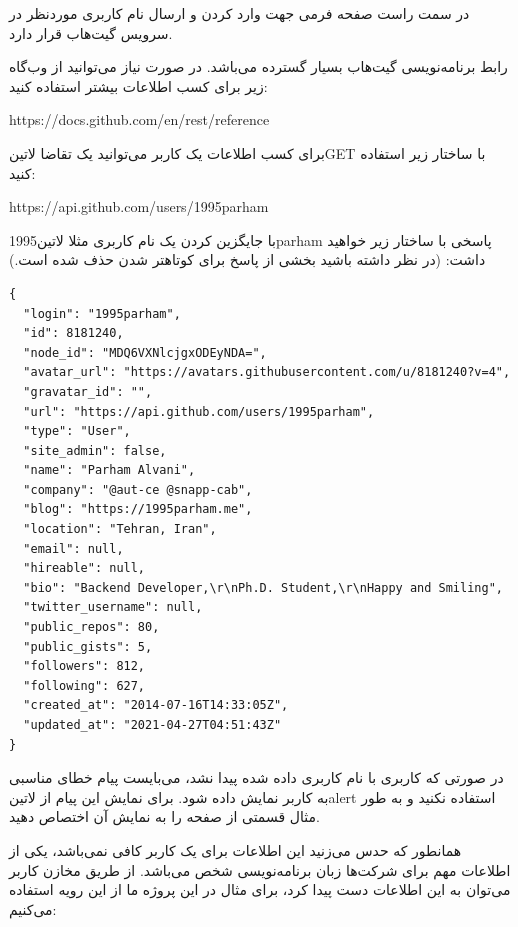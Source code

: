 \documentclass[../main.tex]{subfiles}
\begin{document}
در سمت راست صفحه فرمی جهت وارد کردن و ارسال نام کاربری موردنظر در سرویس گیت‌هاب قرار دارد.

رابط برنامه‌نویسی گیت‌هاب بسیار گسترده می‌باشد. در صورت نیاز می‌توانید از وب‌گاه زیر برای کسب اطلاعات بیشتر استفاده کنید:

\begin{latin}\begin{center}
https://docs.github.com/en/rest/reference
\end{center}\end{latin}

برای کسب اطلاعات یک کاربر می‌توانید یک تقاضا ‌لاتین{GET} با ساختار زیر استفاده کنید:

\begin{latin}\begin{center}
https://api.github.com/users/1995parham
\end{center}\end{latin}

با جایگزین کردن یک نام کاربری مثلا ‌لاتین{1995parham} پاسخی با ساختار زیر خواهید داشت:
(در نظر داشته باشید بخشی از پاسخ برای کوتاهتر شدن حذف شده است.)

\begin{latin}
\begin{verbatim}
{
  "login": "1995parham",
  "id": 8181240,
  "node_id": "MDQ6VXNlcjgxODEyNDA=",
  "avatar_url": "https://avatars.githubusercontent.com/u/8181240?v=4",
  "gravatar_id": "",
  "url": "https://api.github.com/users/1995parham",
  "type": "User",
  "site_admin": false,
  "name": "Parham Alvani",
  "company": "@aut-ce @snapp-cab",
  "blog": "https://1995parham.me",
  "location": "Tehran, Iran",
  "email": null,
  "hireable": null,
  "bio": "Backend Developer,\r\nPh.D. Student,\r\nHappy and Smiling",
  "twitter_username": null,
  "public_repos": 80,
  "public_gists": 5,
  "followers": 812,
  "following": 627,
  "created_at": "2014-07-16T14:33:05Z",
  "updated_at": "2021-04-27T04:51:43Z"
}
\end{verbatim}
\end{latin}

در صورتی که کاربری با نام کاربری داده شده پیدا نشد، می‌بایست پیام خطای مناسبی به کاربر نمایش داده شود.
برای نمایش این پیام از ‌لاتین{alert} استفاده نکنید و به طور مثال قسمتی از صفحه را به نمایش آن اختصاص دهید.

همانطور که حدس می‌زنید این اطلاعات برای یک کاربر کافی نمی‌باشد، یکی از اطلاعات مهم برای شرکت‌ها زبان برنامه‌نویسی شخص می‌باشد.
از طریق مخازن کاربر می‌توان به این اطلاعات دست پیدا کرد، برای مثال در این پروژه ما از این رویه استفاده می‌کنیم:
\end{document}
